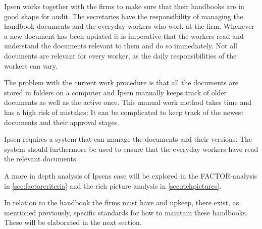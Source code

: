 Ipsen works together with the firms to make sure that their handbooks are in good shape for audit.
The secretaries have the responsibility of managing the handbook documents and the everyday workers who work at the firm.
Whenever a new document has been updated it is imperative that the workers read and understand the documents relevant to them and do so immediately.
Not all documents are relevant for every worker, as the daily responsibilities of the workers can vary.

The problem with the current work procedure is that all the documents are stored in folders on a computer and Ipsen manually keeps track of older documents as well as the active once.
This manual work method takes time and has a high risk of mistakes: 
It can be complicated to keep track of the newest documents and their approval stages. 

Ipsen requires a system that can manage the documents and their versions.
The system should furthermore be used to ensure that the everyday workers have read the relevant documents.

A more in depth analysis of Ipsens case will be explored in the FACTOR-analysis in \cref{sec:factorcriteria} and the rich picture analysis in \cref{sec:richpictures}.

In relation to the handbook the firms must have and upkeep, there exist, as mentioned previously, specific standards for how to maintain these handbooks.
These will be elaborated in the next section.
